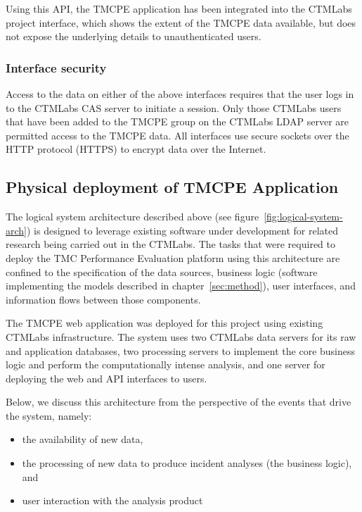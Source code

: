 \documentclass[12pt]{report}
\renewcommand{\fixme}[3][]{#1\xspace}
\newcounter{space}
\begin{document}
Using this \ac{API}, the \ac{TMCPE} application has been integrated into the
\ac{CTMLabs} project interface, which shows the extent of the \ac{TMCPE} data
available, but does not expose the underlying details to
unauthenticated users.

\subsubsection{Interface security}
\label{sec:interface-security}

Access to the data on either of the above interfaces requires that the
user logs in to the \ac{CTMLabs} \ac{CAS} server to initiate a
session.  Only those \ac{CTMLabs} users that have been added to the
\ac{TMCPE} group on the \ac{CTMLabs} \ac{LDAP} server are permitted
access to the \ac{TMCPE} data.  All interfaces use secure sockets over
the HTTP protocol (HTTPS) to encrypt data over the Internet.

\subsection{Physical deployment of TMCPE Application}
\label{sec:arch}

The logical system architecture described above (see
figure~\ref{fig:logical-system-arch}) is designed to leverage existing software
under development for related research being carried out in the \ac{CTMLabs}.
The tasks that were required to deploy the \ac{TMC} Performance Evaluation
platform using this architecture are confined to the specification of the data
sources, business logic (software implementing the models described in
chapter~\ref{sec:method}), user interfaces, and information flows between those
components.

The \ac{TMCPE} web application was deployed for this project using existing
\ac{CTMLabs} infrastructure.  The system uses two \ac{CTMLabs} data servers for
its raw and application databases, two processing servers to implement the core
business logic and perform the computationally intense analysis, and one server
for deploying the web and API interfaces to users.  

Below, we discuss this architecture from the perspective of the events that
drive the system, namely:
\begin{itemize}
\item the availability of new data,
\item the processing of new data to produce incident analyses (the business
  logic), and
\item user interaction with the analysis product
\end{itemize}
\end{document}
